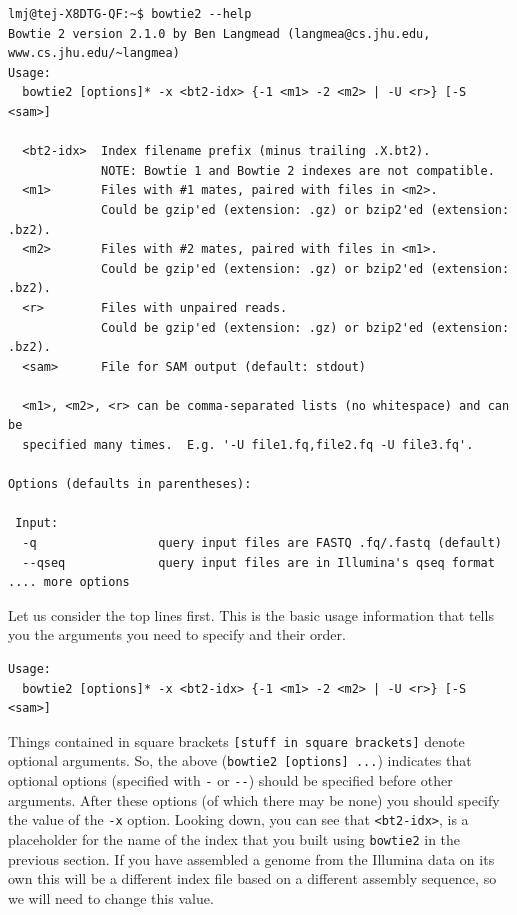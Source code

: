 \documentclass[11pt]{article}
\begin{document}
\begin{verbatim}
lmj@tej-X8DTG-QF:~$ bowtie2 --help
Bowtie 2 version 2.1.0 by Ben Langmead (langmea@cs.jhu.edu, www.cs.jhu.edu/~langmea)
Usage: 
  bowtie2 [options]* -x <bt2-idx> {-1 <m1> -2 <m2> | -U <r>} [-S <sam>]

  <bt2-idx>  Index filename prefix (minus trailing .X.bt2).
             NOTE: Bowtie 1 and Bowtie 2 indexes are not compatible.
  <m1>       Files with #1 mates, paired with files in <m2>.
             Could be gzip'ed (extension: .gz) or bzip2'ed (extension: .bz2).
  <m2>       Files with #2 mates, paired with files in <m1>.
             Could be gzip'ed (extension: .gz) or bzip2'ed (extension: .bz2).
  <r>        Files with unpaired reads.
             Could be gzip'ed (extension: .gz) or bzip2'ed (extension: .bz2).
  <sam>      File for SAM output (default: stdout)

  <m1>, <m2>, <r> can be comma-separated lists (no whitespace) and can be
  specified many times.  E.g. '-U file1.fq,file2.fq -U file3.fq'.

Options (defaults in parentheses):

 Input:
  -q                 query input files are FASTQ .fq/.fastq (default)
  --qseq             query input files are in Illumina's qseq format
.... more options
\end{verbatim}

Let us consider the top lines first. This is the basic usage information
that tells you the arguments you need to specify and their order.


\begin{verbatim}
Usage: 
  bowtie2 [options]* -x <bt2-idx> {-1 <m1> -2 <m2> | -U <r>} [-S <sam>]
\end{verbatim}

Things contained in square brackets \texttt{[stuff in square brackets]} denote
optional arguments. So, the above (\texttt{bowtie2 [options] ...}) indicates that optional options (specified
with \texttt{-} or \texttt{-{}-}) should be specified before other arguments. After these
options (of which there may be none) you should specify the value of the \texttt{-x}
option. Looking down, you can see that \texttt{<bt2-idx>}, is a placeholder for
the name of the index that you built using \texttt{bowtie2} in the
previous section. If you have assembled a genome from the Illumina data on
its own this will be a different index file based on a different assembly
sequence, so we will need to change this value.
\end{document}
